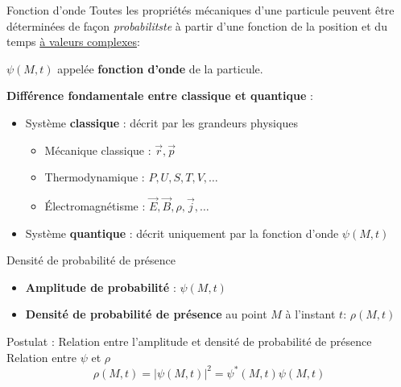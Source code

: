 \begin{Definition}[colbacktitle=red!75!black]{Fonction d'onde}{}
Toutes les propriétés mécaniques d'une particule peuvent être déterminées de façon \textit{probabilitste} à partir d'une fonction de la position et du temps \underline{à valeurs complexes}:
\begin{center}
  $\boxed{\psi(M,t)}$ appelée \textbf{fonction d'onde} de la particule.
\end{center}
\end{Definition}




\textbf{Différence fondamentale entre classique et quantique} : 
\begin{itemize}
    \item Système \textbf{classique} : décrit par les grandeurs physiques
        \begin{itemize}
            \item Mécanique classique : $\overrightarrow{r}, \overrightarrow{p}$ 
            \item Thermodynamique : $P,U,S,T,V,\ldots$
            \item Électromagnétisme : $\overrightarrow{E} ,\overrightarrow{B} , \rho, \overrightarrow{j} ,\ldots$
        \end{itemize}
    \item Système \textbf{quantique} : décrit uniquement par la fonction d'onde $\psi(M,t)$
\end{itemize}

\begin{Definition}[colbacktitle=red!75!black]{Densité de probabilité de présence}{}
\begin{itemize}
    \item  \textbf{Amplitude de probabilité} : $\psi(M,t)$
    \item  \textbf{Densité de probabilité de présence} au point $M$ à l'instant $t$: $\boxed{\rho(M,t)}$
\end{itemize}
\end{Definition}

\begin{Prop}{Postulat : Relation entre l'amplitude et densité de probabilité de présence}{}
Relation entre $\psi$ et $\rho$
        \[
        \boxed{
        \rho(M,t) = |\psi(M,t)|^{2} = \psi^{*}(M,t) \psi(M,t)}
        \]
\end{Prop}


